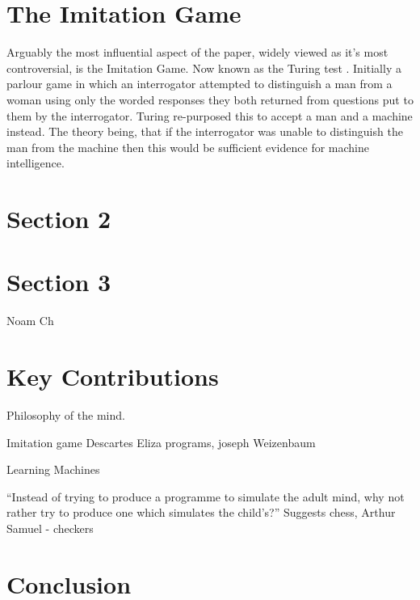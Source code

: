 \documentclass{scrartcl}
\begin{document}
\section{The Imitation Game}

Arguably the most influential aspect of the paper, widely viewed as it's most controversial, is the Imitation Game. Now known as the Turing test \cite{suchman1987plans:6}. Initially a parlour game in which an interrogator attempted to distinguish a man from a woman using only the worded responses they both returned from questions put to them by the interrogator. Turing re-purposed this to accept a man and a machine instead. The theory being, that if the interrogator was unable to distinguish the man from the machine then this would be sufficient evidence for machine intelligence. \par
\cite{weizenbaum1966eliza:7}

\section{Section 2}



\section{Section 3}
Noam Ch


\section{Key Contributions}
Philosophy of the mind.

Imitation game
Descartes
Eliza programs, joseph Weizenbaum

Learning Machines

“Instead of trying to produce a programme to simulate the adult mind, why not rather try to produce one which simulates the child’s?”
Suggests chess, Arthur Samuel - checkers


\section{Conclusion}





\end{document}
